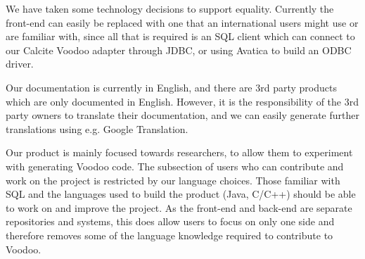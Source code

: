 We have taken some technology decisions to support equality. Currently the front-end can easily be replaced with one that an international users might use or are familiar with, since all that is required is an SQL client which can connect to our Calcite Voodoo adapter through JDBC, or using Avatica to build an ODBC driver.

Our documentation is currently in English, and there are 3rd party products which are only documented in English. However, it is the responsibility of the 3rd party owners to translate their documentation, and we can easily generate further translations using e.g. Google Translation.

Our product is mainly focused towards researchers, to allow them to experiment with generating Voodoo code. The subsection of users who can contribute and work on the project is restricted by our language choices. Those familiar with SQL and the languages used to build the product (Java, C/C++) should be able to work on and improve the project. As the front-end and back-end are separate repositories and systems, this does allow users to focus on only one side and therefore removes some of the language knowledge required to contribute to Voodoo.
